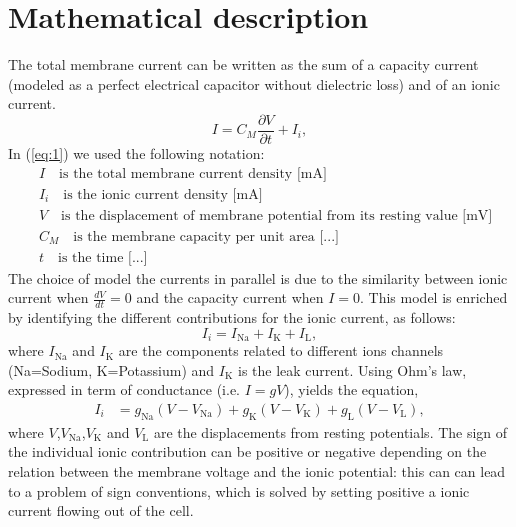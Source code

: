 \documentclass[a4paper,11pt ]{report}
\theoremstyle{definition}
\begin{document}
\section{Mathematical description}
The total membrane current can be written as the sum of a capacity current (modeled as a perfect electrical capacitor without dielectric loss) and of an ionic current.
\begin{equation}\label{eq:1}
I=C_M\frac{\partial V}{\partial t}+I_i,
\end{equation}
In (\ref{eq:1}) we used the following notation:
\begin{align*}
&I \quad \text{is the total membrane current density [mA]}\\
&I_i \quad \text{is the ionic current density [mA]}\\
&V \quad \text{is the displacement of membrane potential from its resting value [mV]}\\
&C_M \quad \text{is the membrane capacity per unit area [...]}\\
&t \quad \text{is the time [...]}
\end{align*}
The choice of model the currents in parallel is due to the similarity between ionic current when $\frac{dV}{dt}=0$ and the capacity current when $I=0$. This model is enriched by identifying the different contributions for the ionic current, as follows:
\begin{equation*}
I_i=I_\text{Na}+I_\text{K}+I_\text{L},
\end{equation*}
where $I_\text{Na}$ and $I_\text{K}$ are the components related to  different ions channels (Na=Sodium, K=Potassium) and $I_\text{K}$ is the leak current. Using Ohm's law, expressed in term of conductance (i.e. $I=gV$), yields the equation, 
\begin{align*}
I_i&=g_\text{Na}(V-V_\text{Na})+g_\text{K}(V-V_\text{K})+g_\text{L}(V-V_\text{L}),
\end{align*}
where $V$,$V_\text{Na}$,$V_\text{K}$ and $V_\text{L}$ are the displacements from resting potentials. The sign of the individual ionic contribution can be positive or negative depending on the relation between the membrane voltage and the ionic potential: this can can lead to a problem of sign conventions, which is solved by setting positive a ionic current flowing out of the cell.
\end{document}
